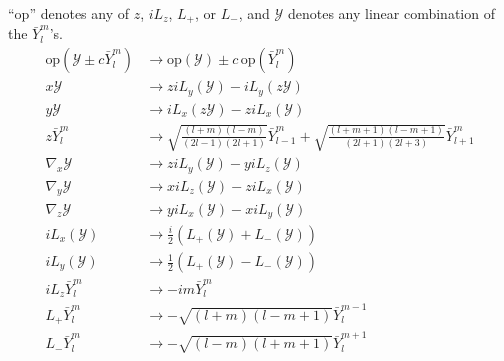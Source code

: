 \documentclass{amsart}
\begin{document}
\noindent
``op'' denotes any of $z$, $iL_z$, $L_+$, or $L_-$, and $\mathcal Y$ denotes any linear combination of the $\bar Y_l^m$'s.
\begin{align*}
\text{op}(\mathcal Y \pm c \bar Y_l^m) &\to \text{op}(\mathcal Y) \pm c \, \text{op}(\bar Y_l^m) \\
x \mathcal Y &\to  z iL_y(\mathcal Y) - i L_y(z\mathcal Y) \\
y \mathcal Y &\to  i L_x(z\mathcal Y) - z iL_x(\mathcal Y) \\
z\bar Y_l^m &\to \sqrt{\frac{(l+m)(l-m)}{(2l-1)(2l+1)}} \bar Y_{l-1}^m + \sqrt{\frac{(l+m+1)(l-m+1)}{(2l+1)(2l+3)}} \bar Y_{l+1}^m \\
\nabla_x \mathcal Y &\to z i L_y(\mathcal Y) - y i L_z(\mathcal Y)  \\
\nabla_y \mathcal Y &\to x i L_z(\mathcal Y) - z i L_x(\mathcal Y)  \\
\nabla_z \mathcal Y &\to y i L_x(\mathcal Y) - x i L_y(\mathcal Y)  \\
iL_x (\mathcal Y) &\to \tfrac i2 \left(L_+ (\mathcal Y) + L_- (\mathcal Y)\right) \\
iL_y (\mathcal Y) &\to \tfrac 12 \left(L_+ (\mathcal Y) - L_- (\mathcal Y)\right) \\
i L_z \bar Y_l^m &\to -im\bar Y_l^m \\
L_+ \bar Y_l^m &\to - \sqrt{(l+m)(l-m+1)}\bar Y_l^{m-1} \\
L_- \bar Y_l^m &\to - \sqrt{(l-m)(l+m+1)}\bar Y_l^{m+1}
\end{align*}
\end{document}
